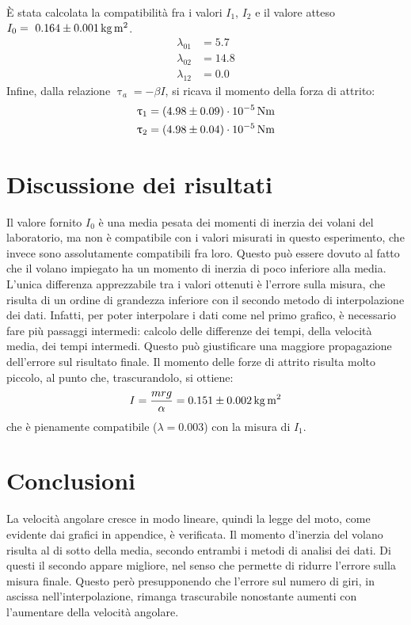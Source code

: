 \documentclass[italian,a4paper]{article}
\renewcommand{\tau}{\uptau} %
\begin{document}
\`E stata calcolata la compatibilità fra i valori $I_1$, $I_2$ e il valore atteso $I_0=\ \unit[0.164 \pm 0.001]{kg \, m^2}$.
\begin{align*}
	\lambda_{01} &= 5.7 \\
	\lambda_{02} &= 14.8 \\
	\lambda_{12} &= 0.0
\end{align*}
Infine, dalla relazione $\tau_a = -\beta I$, si ricava il momento della forza di attrito:
\begin{align*}
	\tau_{1} &= \unit[(4.98\pm0.09)\cdot10^{-5}]{Nm} \\
	\tau_{2} &= \unit[(4.98\pm0.04)\cdot10^{-5}]{Nm}
\end{align*}
\section{Discussione dei risultati}
Il valore fornito $I_0$ è una media pesata dei momenti di inerzia dei volani del laboratorio, ma non è compatibile con i valori misurati in questo esperimento, che invece sono assolutamente compatibili fra loro. Questo può essere dovuto al fatto che il volano impiegato ha un momento di inerzia di poco inferiore alla media.
L'unica differenza apprezzabile tra i valori ottenuti è l'errore sulla misura, che risulta di un ordine di grandezza inferiore con il secondo metodo di interpolazione dei dati. Infatti, per poter interpolare i dati come nel primo grafico, è necessario fare più passaggi intermedi: calcolo delle differenze dei tempi, della velocità media, dei tempi intermedi. Questo può giustificare una maggiore propagazione dell'errore sul risultato finale.
Il momento delle forze di attrito risulta molto piccolo, al punto che, trascurandolo, si ottiene:
\begin{equation*}
	I = \dfrac{mrg}{\alpha} = \unit[0.151 \pm 0.002]{kg \, m^2}
\end{equation*}
che è pienamente compatibile ($\lambda=0.003$) con la misura di $I_1$.
\section{Conclusioni}
La velocità angolare cresce in modo lineare, quindi la legge del moto, come evidente dai grafici in appendice, è verificata. Il momento d'inerzia del volano risulta al di sotto della media, secondo entrambi i metodi di analisi dei dati. Di questi il secondo appare migliore, nel senso che permette di ridurre l'errore sulla misura finale. Questo però presupponendo che l'errore sul numero di giri, in ascissa nell'interpolazione, rimanga trascurabile nonostante aumenti con l'aumentare della velocità angolare.
\newpage
\end{document}
